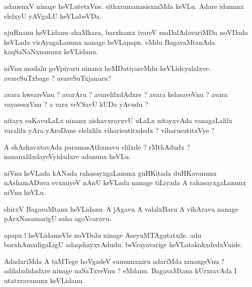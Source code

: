 \documentclass{article}
\begin{document}
\begin{mn}%
adanenxV ninage heVLutetxVne. sithxramanasisxniMda keVLu. Adare idunanx elelxyU yAVgaLU 
heVLabeVDa.
\end{mn}

\begin{mn}%
ajuRnanu heVLidanu--shaMkara, barxhamx ivareV moDalAdavariMDa noVDada keVLada 
visAyagaLanunx nanage heVLapapx. eMdu BagavaMtanAda kaqSaNaNxnanunx keVLidanu.
\end{mn}

\begin{mn}%
niVnu modalu goVpiyaru ninanx heMDatiyareMdu heVLideyalalxve. avareSuTxbage ? 
avareSuTxjanaru?
\end{mn}

\begin{mn}%
avara hwsareVnu ? avarAru ? avarelilxdAdxre ? avara kelasaveVnu ? avara vayasesxVnu ? a
vara veVSavU kUDa yAvudu ?
\end{mn}

\begin{mn}%
nitayx suKavuLaLx ninanx aishavxrayxvU uLaLx nitayxvAda vanagaLalilx varalilx yAra 
yAroDane elelxlilx viharisutitxdedx ? viharusutitxVye ?
\end{mn}

\begin{mn}%
A shAshavxtavAda paramasAthxnavu elilxde ? rMthAdudx ? nananxlilxdayeVyidadxre adanunx heVLu.
\end{mn}

\begin{mn}%
niVnu keVLada kANada rahasayxgaLanunx guHKitada duHKavanunx nAshamADuva svxmiyeV nAnU 
keVLada nanage tiLiyada A rahasayxgaLanunx niVnu heVLu.
\end{mn}

\begin{mn}%
shirxV BagavaMtanu heVLidanu--A jAgavu A valalxBaru A vihAravu nanage pArxNasamarigU saha 
agoVcaravu.
\end{mn}

\begin{mn}%
apapx ! heVLidameVle noVDalu ninage AseyuMTAgutatxde. adu barxhAmxdigaLigU 
adaqshayxvAdudu. beVrayavarige heVLatakakxdedxVnide.
\end{mn}

\begin{mn}%
AdadxriMda A taMTege hoVgadeV sumumxniru adariMda ninangeVnu ? adilalxdidadxre ninage 
naSaTxveVnu ? eMdanu. BagavaMtana kUrxravAda I utatxravanunx keVLidanu.
\end{mn}
\end{document}
